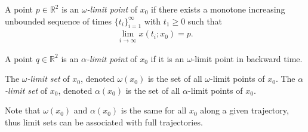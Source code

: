 \begin{definition}
	A point $p \in \mathbb{R}^{2}$ is an \emph{$\omega$-limit point} of $x_0$ if there exists a monotone increasing unbounded sequence of times $\{t_i\}_{i=1}^{\infty}$ with $t_1 \geq 0$ such that 
	\begin{align}
		\lim_{i\to \infty}x(t_i;x_0)=p.
	\end{align}
\end{definition}

\begin{definition}
	A point $q \in \mathbb{R}^{2}$ is an \emph{$\alpha$-limit point} of $x_0$ if it is an $\omega $-limit point in backward time. 
\end{definition}

\begin{definition}
	The \emph{$\omega $-limit set} of $x_0$, denoted $\omega(x_0)$ is the set of all $\omega$-limit points of $x_0$.
	The \emph{$\alpha $-limit set} of $x_0$, denoted $\alpha(x_0)$ is the set of all $\alpha$-limit points of $x_0$.
\end{definition}
\begin{remark}[]
	Note that $\omega(x_0)$ and $\alpha(x_0)$ is the same for all $x_0 $ along a given trajectory, thus limit sets can be associated with full trajectories.
\end{remark}
